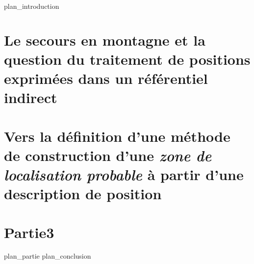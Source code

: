 \label{part:int}
{plan_introduction}
\part{Le secours en montagne et la question du traitement de positions exprimées dans un référentiel indirect}
\label{part:01}
\part{Vers la définition d'une méthode de construction d'une
  \emph{zone de localisation probable} à partir d'une description de
  position}
\label{part:02}
\part{Partie3}
\label{part:03}
{plan_partie}
\label{part:cnl}
{plan_conclusion}

